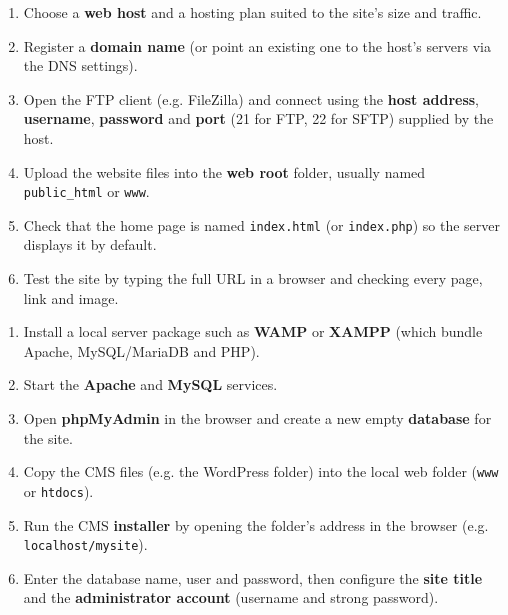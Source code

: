 \documentclass[11pt]{article}
\begin{document}
\begin{methode}
\begin{enumerate}
\item Choose a \textbf{web host} and a hosting plan suited to the site's size and traffic.
\item Register a \textbf{domain name} (or point an existing one to the host's servers via the DNS settings).
\item Open the FTP client (e.g. FileZilla) and connect using the \textbf{host address}, \textbf{username}, \textbf{password} and \textbf{port} (21 for FTP, 22 for SFTP) supplied by the host.
\item Upload the website files into the \textbf{web root} folder, usually named \texttt{public\_html} or \texttt{www}.
\item Check that the home page is named \texttt{index.html} (or \texttt{index.php}) so the server displays it by default.
\item Test the site by typing the full URL in a browser and checking every page, link and image.
\end{enumerate}
\end{methode}

\begin{methode}
\begin{enumerate}
\item Install a local server package such as \textbf{WAMP} or \textbf{XAMPP} (which bundle Apache, MySQL/MariaDB and PHP).
\item Start the \textbf{Apache} and \textbf{MySQL} services.
\item Open \textbf{phpMyAdmin} in the browser and create a new empty \textbf{database} for the site.
\item Copy the CMS files (e.g. the WordPress folder) into the local web folder (\texttt{www} or \texttt{htdocs}).
\item Run the CMS \textbf{installer} by opening the folder's address in the browser (e.g. \texttt{localhost/mysite}).
\item Enter the database name, user and password, then configure the \textbf{site title} and the \textbf{administrator account} (username and strong password).
\end{enumerate}
\end{methode}
\end{document}
